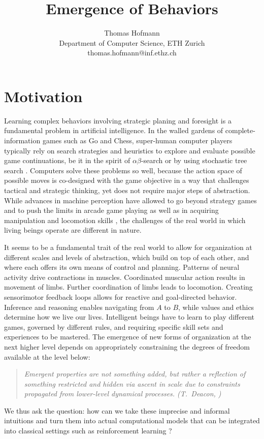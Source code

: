 \documentclass{article}
\title{
	Emergence of Behaviors 
}
\author{
	Thomas Hofmann \\[1mm] Department of Computer Science, ETH Zurich \\ thomas.hofmann@inf.ethz.ch
}
\begin{document}
\maketitle 

\section{Motivation} 

Learning complex behaviors involving strategic planing and foresight is a fundamental problem in artificial intelligence.  In the walled gardens of complete-information  games such as Go and Chess, super-human computer players  typically rely on search strategies and heuristics to explore and evaluate possible game continuations, be it in the spirit of $\alpha\beta$-search \cite{schaeffer1989history,campbell2002deep,hsu2004behind} or by using stochastic tree search \cite{silver2017mastering,silver2017alphazero}. Computers solve these problems so well, because the action space of possible moves is co-designed with the game objective in a way that challenges tactical and strategic thinking, yet does not require major steps of abstraction. While advances in machine perception have allowed to go beyond strategy games and to push the limits in arcade game playing \cite{mnih2013playing} as well as in acquiring manipulation and locomotion skills \cite{schulman2015high,heess2015learning,levine2016end}, the challenges of the real world in which living beings operate are different in nature. 

It seems to be a fundamental trait of the real world to allow for organization at different scales and levels of abstraction, which build on top of each other, and where each offers its own means of control and planning. Patterns of neural activity drive contractions in muscles. Coordinated muscular action results in movement of limbs. Further coordination of limbs leads to locomotion. Creating sensorimotor feedback loops allows for reactive and goal-directed behavior. Inference and reasoning enables navigating from $A$ to $B$, while values and ethics determine how we live our lives. Intelligent beings have to learn to play different games, governed by different rules, and requiring specific skill sets and experiences to be mastered. The emergence of new forms of organization at the next higher level depends on appropriately constraining the degrees of freedom available at the level below:
\begin{quote} 
\textit{Emergent properties are not something added, but rather a reflection of something restricted and hidden via ascent in scale due to constraints propagated from lower-level dynamical processes. (T.~Deacon, \cite[p.~205]{deacon2011incomplete})}
\end{quote}
We thus ask the question: how can we take these imprecise and informal intuitions and turn them into actual computational models that can be integrated into classical settings such as reinforcement learning \cite{sutton1998reinforcement}?
\end{document}
